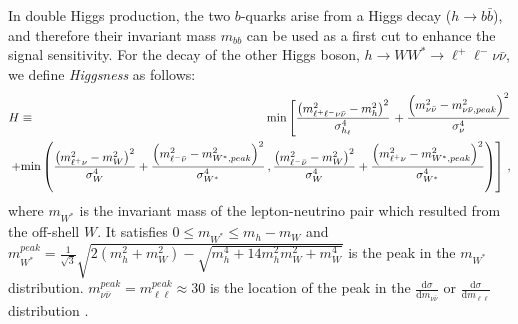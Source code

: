 In double Higgs production, the two $b$-quarks arise from a Higgs decay ($h \to b \bar b$), and therefore their invariant mass $m_{bb}$
can be used as a first cut to enhance the signal sensitivity. 
For the decay of the other Higgs boson, $h \to W W^* \to \ell^+ \ell^- \nu \bar\nu$, we define {\it Higgsness} \cite{Kim:2018cxf} as follows: 
%
\begin{eqnarray}
H &\equiv&    {\rm min} \left [
 \frac{\left ( m^2_{\ell^+\ell^-\nu \bar\nu} - m^2_h \right )^2}{\sigma_{h_\ell}^4}    \right. 
 + \frac{ \left ( m_{\nu  \bar\nu}^2 -  m_{\nu\bar\nu, peak}^2 \right )^2}{ \sigma^4_{\nu}}
 \label{eq:hww}   \\
 && \hspace*{-1cm}  \left. + {\min} \left ( 
\frac{\left ( m^2_{\ell^+ \nu } - m^2_W \right )^2}{\sigma_W^4} + 
\frac{\left ( m^2_{\ell^- \bar \nu} - m^2_{W^*, peak} \right )^2}{\sigma_{W^*}^4}  \, , 
\frac{\left ( m^2_{\ell^- \bar \nu} - m^2_W \right )^2}{\sigma_W^4} + 
\frac{\left ( m^2_{\ell^+ \nu} - m^2_{W^*, peak} \right )^2}{\sigma_{W^*}^4}  
\right )  \right ]   \, , \nonumber
\end{eqnarray}
%
%
where $m_{W^*}$ is the invariant mass of the lepton-neutrino pair which resulted from the off-shell $W$. 
It satisfies $0 \leq m_{W^*} \leq m_h- m_W$ and $m_{W^*}^{peak} = \frac{1}{\sqrt{3}} \sqrt{ 2 \left ( m_h^2 + m_W^2 \right ) - \sqrt{m_h^4 + 14 m_h^2 m_W^2 + m_W^4}}$ is the peak in the $m_{W^*}$ distribution.
$m_{\nu\bar\nu}^{peak} = m_{\ell\ell}^{peak} \approx 30$ \UGeV is the location of the peak in the $\frac{\textrm{d}\sigma}{\textrm{d} m_{\nu\bar\nu}}$ or $\frac{\textrm{d}\sigma}{\textrm{d} m_{\ell\ell}}$ distribution \cite{Kim:2018cxf,Cho:2012er}.
%
%
%
%
%
%

